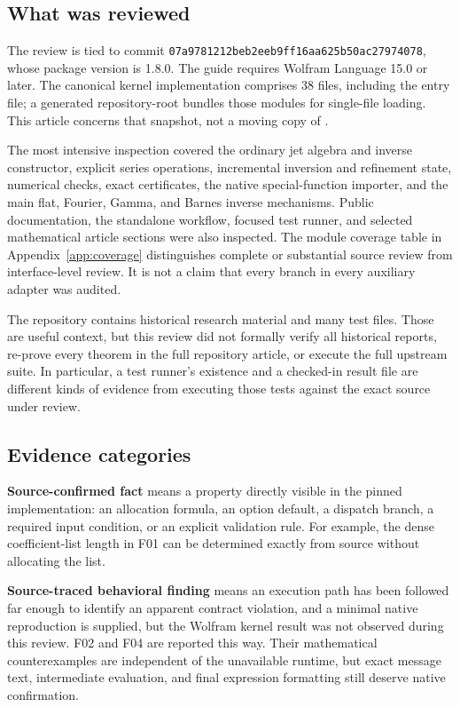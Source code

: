 \documentclass[11pt,a4paper]{article}
\newcommand{\code}[1]{\texttt{\detokenize{#1}}}
\newcommand{\snapshot}{\texttt{07a9781212beb2eeb9ff16aa625b50ac27974078}}
\theoremstyle{definition}
\begin{document}
\subsection{What was reviewed}

The review is tied to commit \snapshot, whose package version is 1.8.0. The guide requires Wolfram Language 15.0 or later. The canonical kernel implementation comprises 38 \code{.wl} files, including the entry file; a generated repository-root \code{AsymptoticInverse.wl} bundles those modules for single-file loading. This article concerns that snapshot, not a moving copy of \code{main}.\cite{repo,guide,standalone}

The most intensive inspection covered the ordinary jet algebra and inverse constructor, explicit series operations, incremental inversion and refinement state, numerical checks, exact certificates, the native special-function importer, and the main flat, Fourier, Gamma, and Barnes inverse mechanisms. Public documentation, the standalone workflow, focused test runner, and selected mathematical article sections were also inspected. The module coverage table in Appendix~\ref{app:coverage} distinguishes complete or substantial source review from interface-level review. It is not a claim that every branch in every auxiliary adapter was audited.

The repository contains historical research material and many test files. Those are useful context, but this review did not formally verify all historical reports, re-prove every theorem in the full repository article, or execute the full upstream suite. In particular, a test runner's existence and a checked-in result file are different kinds of evidence from executing those tests against the exact source under review.

\subsection{Evidence categories}

\textbf{Source-confirmed fact} means a property directly visible in the pinned implementation: an allocation formula, an option default, a dispatch branch, a required input condition, or an explicit validation rule. For example, the dense coefficient-list length in F01 can be determined exactly from source without allocating the list.

\textbf{Source-traced behavioral finding} means an execution path has been followed far enough to identify an apparent contract violation, and a minimal native reproduction is supplied, but the Wolfram kernel result was not observed during this review. F02 and F04 are reported this way. Their mathematical counterexamples are independent of the unavailable runtime, but exact message text, intermediate evaluation, and final expression formatting still deserve native confirmation.
\end{document}
